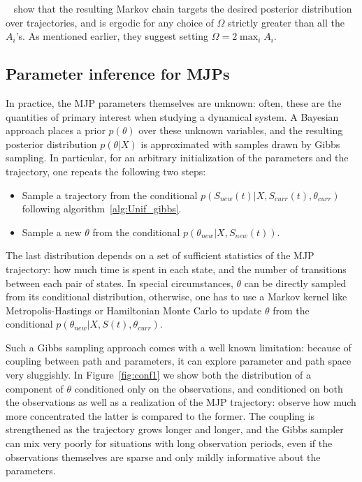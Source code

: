     ~\cite{RaoTeh12} show that the resulting Markov chain targets
    the desired posterior distribution over trajectories, and is 
    ergodic for any choice of $\Omega$ strictly greater than all the
    $A_i$'s. As mentioned earlier, they suggest setting $\Omega = 2\max_i A_i$.

\subsection{Parameter inference for MJPs}
In practice, the MJP parameters themselves are unknown: often,
these are the quantities of primary interest when studying a dynamical
system. A Bayesian approach
places a prior $p(\theta)$ over these unknown variables, and the
resulting posterior distribution $p(\theta|X)$ is approximated
with samples drawn by Gibbs sampling. In particular, for an arbitrary 
initialization of the parameters and the trajectory, one repeats the
following two steps:
\begin{itemize}
  \item Sample a trajectory from the conditional 
    $p(S_{new}(t)|X,S_{curr}(t),\theta_{curr})$ following 
    algorithm~\ref{alg:Unif_gibbs}.
  \item Sample a new $\theta$ from the conditional 
    $p(\theta_{new}|X,S_{new}(t))$.
\end{itemize}
The last distribution depends on a set of sufficient statistics of the 
MJP trajectory: how
much time is spent in each state, and the number of transitions
between each pair of states. 
In special circumstances, $\theta$ can be directly sampled from its 
conditional distribution, otherwise, one has to use a Markov kernel like
Metropolis-Hastings or Hamiltonian Monte Carlo to update $\theta$ from the
conditional $p(\theta_{new}|X,S(t),\theta_{curr})$. 

Such a Gibbs sampling approach comes with a well known limitation:
because of coupling between path and parameters, it can explore parameter 
and path space very sluggishly. In Figure~\ref{fig:conf1} 
we show
both the distribution of a component of $\theta$ conditioned
only on the observations, and conditioned on both the observations 
as well as a realization of the MJP trajectory: observe how much
more concentrated the latter is compared to the former. The
coupling is strengthened as the trajectory grows longer and longer, and
the Gibbs sampler can mix very poorly for situations with
long observation periods, even if the observations themselves are
sparse and only mildly informative about the parameters.

